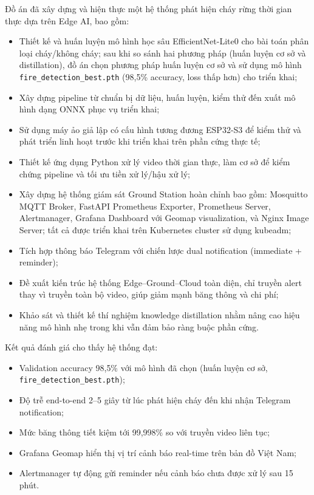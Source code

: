 \documentclass[12pt,a4paper]{report}
\begin{document}
Đồ án đã xây dựng và hiện thực một hệ thống phát hiện cháy rừng thời gian thực dựa trên Edge AI, bao gồm:
\begin{itemize}
  \item Thiết kế và huấn luyện mô hình học sâu EfficientNet-Lite0 cho bài toán phân loại cháy/không cháy; sau khi so sánh hai phương pháp (huấn luyện cơ sở và distillation), đồ án chọn phương pháp huấn luyện cơ sở và sử dụng mô hình \texttt{fire\_detection\_best.pth} (98{,}5\% accuracy, loss thấp hơn) cho triển khai;
  \item Xây dựng pipeline từ chuẩn bị dữ liệu, huấn luyện, kiểm thử đến xuất mô hình dạng ONNX phục vụ triển khai;
  \item Sử dụng máy ảo giả lập có cấu hình tương đương ESP32-S3 để kiểm thử và phát triển linh hoạt trước khi triển khai trên phần cứng thực tế;
  \item Thiết kế ứng dụng Python xử lý video thời gian thực, làm cơ sở để kiểm chứng pipeline và tối ưu tiền xử lý/hậu xử lý;
  \item Xây dựng hệ thống giám sát Ground Station hoàn chỉnh bao gồm: Mosquitto MQTT Broker, FastAPI Prometheus Exporter, Prometheus Server, Alertmanager, Grafana Dashboard với Geomap visualization, và Nginx Image Server; tất cả được triển khai trên Kubernetes cluster sử dụng kubeadm;
  \item Tích hợp thông báo Telegram với chiến lược dual notification (immediate + reminder);
  \item Đề xuất kiến trúc hệ thống Edge--Ground--Cloud toàn diện, chỉ truyền alert thay vì truyền toàn bộ video, giúp giảm mạnh băng thông và chi phí;
  \item Khảo sát và thiết kế thí nghiệm knowledge distillation nhằm nâng cao hiệu năng mô hình nhẹ trong khi vẫn đảm bảo ràng buộc phần cứng.
\end{itemize}

Kết quả đánh giá cho thấy hệ thống đạt:
\begin{itemize}
  \item Validation accuracy 98{,}5\% với mô hình đã chọn (huấn luyện cơ sở, \texttt{fire\_detection\_best.pth});
  \item Độ trễ end-to-end 2--5 giây từ lúc phát hiện cháy đến khi nhận Telegram notification;
  \item Mức băng thông tiết kiệm tới 99{,}998\% so với truyền video liên tục;
  \item Grafana Geomap hiển thị vị trí cảnh báo real-time trên bản đồ Việt Nam;
  \item Alertmanager tự động gửi reminder nếu cảnh báo chưa được xử lý sau 15 phút.
\end{itemize}
\end{document}
